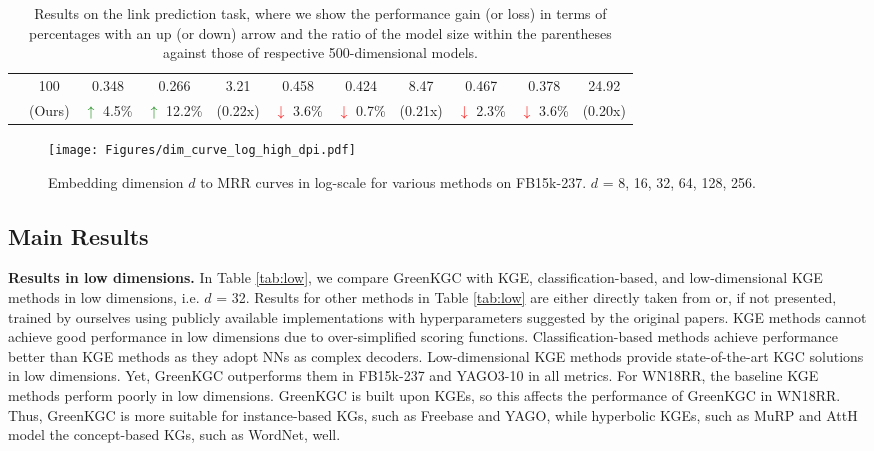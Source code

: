 \documentclass{article}
\begin{document}
\begin{table*}[!t]
\begin{tabular}{l|c | ccc | ccc | ccc}
\cline{2-11}

& 100
& 0.348 & 0.266 & 3.21 
& 0.458 & 0.424 & 8.47 
& 0.467 & 0.378 & 24.92 \\
& (Ours)
& \textcolor{green}{$\uparrow$} 4.5\% & \textcolor{green}{$\uparrow$} 12.2\% & (0.22x)
& \textcolor{red}{$\downarrow$} 3.6\% & \textcolor{red}{$\downarrow$} 0.7\% & (0.21x) 
& \textcolor{red}{$\downarrow$} 2.3\% & \textcolor{red}{$\downarrow$} 3.6\% & (0.20x) \\
\hline
\end{tabular}
\caption{Results on the link prediction task, where we show the
performance gain (or loss) in terms of percentages with an up (or down)
arrow and the ratio of the model size within the parentheses against
those of respective 500-dimensional models.} \label{tab:main}
\end{table*}


\begin{figure}[t]
\centering
\texttt{[image: Figures/dim\_curve\_log\_high\_dpi.pdf]}
\caption{Embedding dimension $d$ to MRR curves in log-scale for various 
methods on FB15k-237. $d$ = 8, 16, 32, 64, 128, 256.}\label{fig:dim_curve}
\end{figure}


\subsection{Main Results}

\textbf{Results in low dimensions.} In Table \ref{tab:low}, we compare
GreenKGC with KGE, classification-based, and low-dimensional KGE methods in
low dimensions, i.e. $d$ = 32. Results for other methods in Table \ref{tab:low} 
are either directly taken from \citep{chami2020low, zhu2022dualde}
or, if not presented, trained by ourselves using publicly available 
implementations with hyperparameters suggested by the original papers.
KGE methods cannot achieve good performance in low dimensions 
due to over-simplified scoring functions. Classification-based methods achieve 
performance better than KGE methods as they adopt NNs as complex
decoders. Low-dimensional KGE methods provide state-of-the-art 
KGC solutions in low dimensions. Yet, GreenKGC outperforms them 
in FB15k-237 and YAGO3-10 in all metrics.
{\color{black}
For WN18RR, the baseline KGE methods perform poorly in low dimensions.
GreenKGC is built upon
KGEs, so this affects the performance of GreenKGC in WN18RR. 
Thus, GreenKGC is more suitable for instance-based KGs, such as 
Freebase and YAGO, while hyperbolic KGEs, such as MuRP and AttH model
the concept-based KGs, such as WordNet, well.
}
\end{document}
